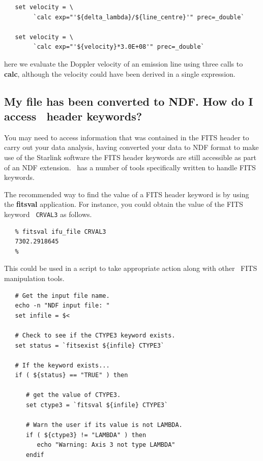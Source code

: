 \documentclass[twoside,11pt]{article}
\newcommand{\htmlref}[2]{#1}
\newcommand{\xref}[3]{#1}
\newcommand{\xlabel}[1]{}
\begin{document}
{\begin{verbatim}
   set velocity = \
        `calc exp="'${delta_lambda}/${line_centre}'" prec=_double`

   set velocity = \
        `calc exp="'${velocity}*3.0E+08'" prec=_double`
\end{verbatim}\normalsize

here we evaluate the Doppler velocity of an emission line using three calls 
to {\bf calc}, although the velocity could have been derived in a single
expression.

\subsection{\xlabel{sc16_fitsheader}My file has been converted to NDF.
How do I access \FITSref\ header keywords?\label{sc16_fitsheader}}

You may need to access information that was contained in the FITS
header to carry out your data analysis, having converted your data to
\xref{NDF}{sun33}{} format to make use of the Starlink software the
FITS header keywords are still accessible as part of an NDF extension.
\KAPPAref\ has a number of tools specifically written to handle
\xref{FITS keywords}{sun95}{se_fitsairlock}\latexonly{ (see SUN/95 for
details)}.

The recommended way to find the value of a FITS header keyword is by
using the \xref{{\bf fitsval}}{sun95}{FITSVAL} application.  For instance, you
could obtain the value of the FITS keyword \htmlref{{\tt
CRVAL3}}{sc16_teifufile}\latexonly{ (see
Section~\ref{sc16_teifufile})} as follows.

\small\begin{verbatim}
   % fitsval ifu_file CRVAL3
   7302.2918645
   %
\end{verbatim}\normalsize

This could be used in a script to take appropriate action along with
other \KAPPA\ \xref{FITS manipulation tools}{sun95}{se_fitsairlock}.

\small\begin{verbatim}
   # Get the input file name.
   echo -n "NDF input file: "
   set infile = $<
   
   # Check to see if the CTYPE3 keyword exists.
   set status = `fitsexist ${infile} CTYPE3`
   
   # If the keyword exists...
   if ( ${status} == "TRUE" ) then
   
      # get the value of CTYPE3.
      set ctype3 = `fitsval ${infile} CTYPE3`

      # Warn the user if its value is not LAMBDA.
      if ( ${ctype3} != "LAMBDA" ) then
         echo "Warning: Axis 3 not type LAMBDA"
      endif
      

\end{verbatim}}
\end{document}

